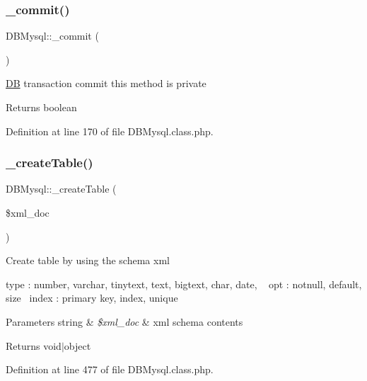 \subsubsection{\texorpdfstring{\+\_\+commit()}{\_commit()}}
{\footnotesize\ttfamily D\+B\+Mysql\+::\+\_\+commit (\begin{DoxyParamCaption}{ }\end{DoxyParamCaption})}

\hyperlink{classDB}{DB} transaction commit this method is private \begin{DoxyReturn}{Returns}
boolean 
\end{DoxyReturn}


Definition at line 170 of file D\+B\+Mysql.\+class.\+php.

\hypertarget{classDBMysql_a7a3edda6d00b0c7b3702283b495b0a5d}{}\label{classDBMysql_a7a3edda6d00b0c7b3702283b495b0a5d} 
\subsubsection{\texorpdfstring{\+\_\+create\+Table()}{\_createTable()}}
{\footnotesize\ttfamily D\+B\+Mysql\+::\+\_\+create\+Table (\begin{DoxyParamCaption}\item[{}]{\$xml\+\_\+doc }\end{DoxyParamCaption})}

Create table by using the schema xml

type \+: number, varchar, tinytext, text, bigtext, char, date, ~\newline
opt \+: notnull, default, size~\newline
index \+: primary key, index, unique~\newline

\begin{DoxyParams}[1]{Parameters}
string & {\em \$xml\+\_\+doc} & xml schema contents \\
\hline
\end{DoxyParams}
\begin{DoxyReturn}{Returns}
void$\vert$object 
\end{DoxyReturn}


Definition at line 477 of file D\+B\+Mysql.\+class.\+php.

\hypertarget{classDBMysql_aa1f3d836a8da807793983ff3f48998da}{}\label{classDBMysql_aa1f3d836a8da807793983ff3f48998da} 
